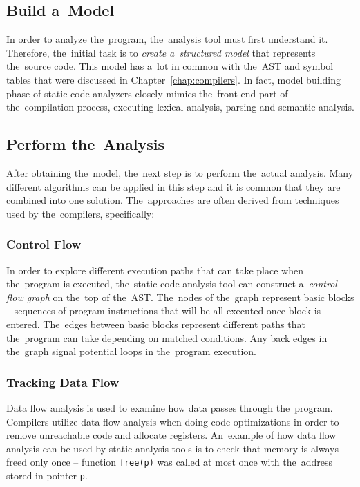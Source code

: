\documentclass[
  digital, %
  table,   %
  lof,     %
  lot,     %
  oneside,
]{fithesis3}
\begin{document}
\subsection{Build a~Model}
In order to analyze the~program, the~analysis tool must first understand it. Therefore, the~initial task is to \textit{create a~structured model} that represents the~source code. This model has a~lot in common with the~AST and symbol tables that were discussed in Chapter~\ref{chap:compilers}. In fact, model building phase of static code analyzers closely mimics the~front end part of the~compilation process, executing lexical analysis, parsing and semantic analysis.

\subsection{Perform the~Analysis}
After obtaining the~model, the~next step is to perform the~actual analysis. Many different algorithms can be applied in this step and it is common that they are combined into one solution. The~approaches are often derived from techniques used by the~compilers, specifically:

\subsubsection{\textbf{Control Flow}}
In order to explore different execution paths that can take place when the~program is executed, the~static code analysis tool can construct a~\textit{control flow graph} on the~top of the~AST. The~nodes of the~graph represent basic blocks -- sequences of program instructions that will be all executed once block is entered. The~edges between basic blocks represent different paths that the~program can take depending on matched conditions. Any back edges in the~graph signal potential loops in the~program execution.

\subsubsection{\textbf{Tracking Data Flow}}
Data flow analysis is used to examine how data passes through the~program. Compilers utilize data flow analysis when doing code optimizations in order to remove unreachable code and allocate registers. An~example of how data flow analysis can be used by static analysis tools is to check that memory is always freed only once -- function \texttt{free(p)} was called at most once with the~address stored in pointer \texttt{p}.
\end{document}
